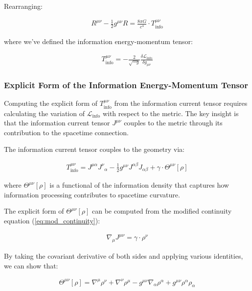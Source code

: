 \documentclass[11pt,english,twoside]{article}
\begin{document}
Rearranging:

\begin{align}
R^{\mu\nu} - \frac{1}{2}g^{\mu\nu}R = \frac{8\pi G}{c^4} \cdot T^{\mu\nu}_{\text{info}}
\end{align}

where we've defined the information energy-momentum tensor:

\begin{align}
T^{\mu\nu}_{\text{info}} = -\frac{2}{\sqrt{-g}} \frac{\delta \mathcal{L}_{\text{info}}}{\delta g_{\mu\nu}}
\end{align}

\subsubsection{Explicit Form of the Information Energy-Momentum Tensor}

Computing the explicit form of $T^{\mu\nu}_{\text{info}}$ from the information current tensor requires calculating the variation of $\mathcal{L}_{\text{info}}$ with respect to the metric. The key insight is that the information current tensor $J^{\mu\nu}$ couples to the metric through its contribution to the spacetime connection.

The information current tensor couples to the geometry via:

\begin{align}
T^{\mu\nu}_{\text{info}} = J^{\mu\alpha}J^{\nu}{}_{\alpha} - \frac{1}{2}g^{\mu\nu}J^{\alpha\beta}J_{\alpha\beta} + \gamma \cdot \Theta^{\mu\nu}[\rho]
\end{align}

where $\Theta^{\mu\nu}[\rho]$ is a functional of the information density that captures how information processing contributes to spacetime curvature.

The explicit form of $\Theta^{\mu\nu}[\rho]$ can be computed from the modified continuity equation (\ref{eq:mod_continuity}):

\begin{align}
\nabla_\mu J^{\mu\nu} = \gamma \cdot \rho^{\nu}
\end{align}

By taking the covariant derivative of both sides and applying various identities, we can show that:

\begin{align}
\Theta^{\mu\nu}[\rho] = \nabla^{\mu}\rho^{\nu} + \nabla^{\nu}\rho^{\mu} - g^{\mu\nu}\nabla_{\alpha}\rho^{\alpha} + g^{\mu\nu}\rho^{\alpha}\rho_{\alpha}
\end{align}
\end{document}
